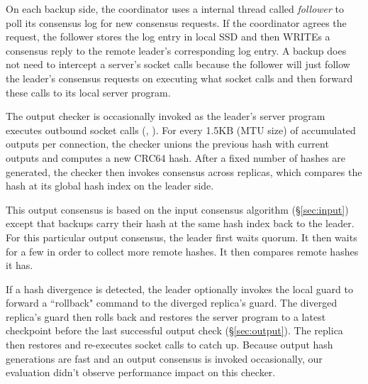 On each backup side, the coordinator uses a \xxx internal thread called 
\emph{follower} to poll its consensus log for new consensus requests. If the 
coordinator agrees the request, the follower stores the log entry in local SSD 
and then WRITEs a consensus reply to the remote leader's corresponding log 
entry. A backup does not need to intercept a server's socket calls because the 
follower will just follow the leader's consensus requests on executing what 
socket calls and then forward these calls to its local server program.




The output checker is occasionally invoked as the leader's server program 
executes outbound socket calls (\eg, \send). For every 1.5KB (MTU size) of 
accumulated outputs per connection, the checker unions the previous hash with 
current outputs and computes a new CRC64 hash. After a fixed number of hashes 
are generated, the checker then invokes consensus across replicas, which 
compares the hash at its global hash index on the leader side.

This output consensus is based on the input consensus algorithm 
(\S\ref{sec:input}) except that backups carry their hash at the same hash index 
back to the leader. For this particular output consensus, the leader first 
waits quorum. It then waits for a few \us in order to collect more remote 
hashes. It then compares remote hashes it has.

If a hash divergence is detected, the leader optionally invokes the local guard 
to forward a ``rollback" command to the diverged replica's guard. The diverged 
replica's guard then rolls back and restores the server program to a latest 
checkpoint before the last successful output check (\S\ref{sec:output}). The 
replica then restores and re-executes socket calls to catch up. Because output 
hash generations are fast and an output consensus is invoked occasionally, our 
evaluation didn't observe performance impact on this checker.

